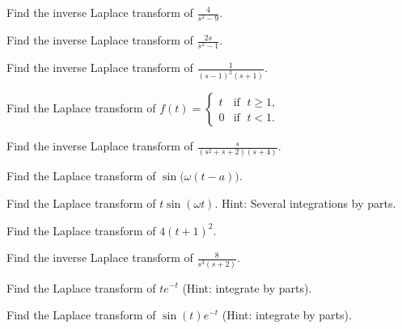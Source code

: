 \begin{exercise}
Find the inverse Laplace transform of $\frac{4}{s^2-9}$.
\end{exercise}

\begin{exercise}
Find the inverse Laplace transform of $\frac{2s}{s^2-1}$.
\end{exercise}

\begin{exercise}
Find the inverse Laplace transform of $\frac{1}{{(s-1)}^2(s+1)}$.
\end{exercise}

\begin{exercise}
Find the Laplace transform of $f(t) =
\begin{cases}
t & \text{if } \; t \geq 1, \\
0 & \text{if } \; t < 1.
\end{cases}$
\end{exercise}

\begin{exercise}
Find the inverse Laplace transform of $\frac{s}{(s^2+s+2)(s+4)}$.
\end{exercise}

\begin{exercise}
Find the Laplace transform of $\sin\bigl(\omega (t-a)\bigr)$.
\end{exercise}

\begin{exercise}
Find the Laplace transform of $t\sin(\omega t)$.  Hint: Several integrations
by parts.
\end{exercise}

\setcounter{exercise}{100}

\begin{exercise}
Find the Laplace transform of $4{(t+1)}^2$.
\end{exercise}

\begin{exercise}
Find the inverse Laplace transform of $\frac{8}{s^3(s+2)}$.
\end{exercise}

\begin{exercise}
Find the Laplace transform of $te^{-t}$ (Hint: integrate by parts).
\end{exercise}

\begin{exercise}
Find the Laplace transform of $\sin(t)e^{-t}$ (Hint: integrate by parts).
\end{exercise}



